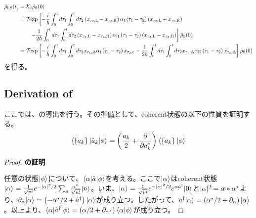 \documentclass[10pt, a4paper]{jsarticle}
\begin{document}
\begin{equation}
\begin{split}
\label{eq:512}
	\hat{\rho}_{\rm I,S}(t) &= \mathcal{K}_{t} \hat{\rho}_{\rm S}(0) \\
		&= \mathcal{T}_{} {\rm exp} \left[ - \dfrac{i}{\hbar} \int_{0}^{t} d\tau_{1} \int_{0}^{t} d\tau_{2}  \left(x_{\tau_{2}, {\rm L}} - x_{\tau_{2}, {\rm R}}\right) \alpha_{\rm I} \left(\tau_{1} - \tau_{2} \right) \left(x_{\tau_{2}, {\rm L}} + x_{\tau_{2}, {\rm R}}\right) \right. \\
		&\qquad \left. - \dfrac{1}{2 \hbar} \int_{0}^{t} d\tau_{1} \int_{0}^{t} d\tau_{2}  \left(x_{\tau_{2}, {\rm L}} - x_{\tau_{2}, {\rm R}}\right) \alpha_{\rm R} \left(\tau_{1} - \tau_{2} \right) \left(x_{\tau_{2}, {\rm L}} - x_{\tau_{2}, {\rm R}}\right) \right] \hat{\rho}_{\rm S}(0) \\
		&= \mathcal{T}_{} {\rm exp} \left[ - \dfrac{i}{\hbar} \int_{0}^{t} d\tau_{1} \int_{0}^{t} d\tau_{2}  x_{\tau_{1}, \Delta} \alpha_{\rm I} \left(\tau_{1} - \tau_{2} \right) x_{\tau_{2}, {\rm c}} - \dfrac{1}{2 \hbar} \int_{0}^{t} d\tau_{1} \int_{0}^{t} d\tau_{2}  x_{\tau_{1}, \Delta} \alpha_{\rm R} \left(\tau_{1} - \tau_{2} \right) x_{\tau_{2}, \Delta} \right] \hat{\rho}_{\rm S}(0)
\end{split}
\end{equation}
を得る。

\subsection{Derivation of }
\label{sec:52}

ここでは、の導出を行う。その準備として、coherent状態の以下の性質を証明する。
\begin{equation}
\begin{split}
\label{eq:513}
	{}_{\rm }\langle \left\{ a_{k} \right\}_{} | \hat{a}_{k} | \phi \rangle_{\rm } = \left( \dfrac{a_{k}}{2} + \dfrac{\partial}{\partial a_{k}^{*}} \right) {}_{\rm }\langle \left\{ a_{k} \right\}_{} | \phi \rangle_{\rm }
\end{split}
\end{equation}

\begin{proof}{\textbf{の証明}}

	任意の状態$| \phi \rangle_{\rm }$について、${}_{\rm }\langle \alpha | \hat{a}_{} | \phi \rangle_{\rm }$を考える。ここで$| \alpha \rangle_{\rm }$はcoherent状態$| \alpha \rangle_{\rm } = \frac{1}{\sqrt{pi}} e^{- | \alpha |^{2}/2} \sum_{n} \frac{\alpha^{n}}{\sqrt{n!}} | n \rangle_{\rm }$。いま、$| \alpha \rangle_{\rm } = \frac{1}{\sqrt{pi}} e^{- | \alpha |^{2}/2} e^{\alpha \hat{a}_{}^{\dagger}} | 0 \rangle_{\rm }$と$| \alpha |^{2} = \alpha * \alpha^{*}$より、$\partial_{\alpha} | \alpha \rangle_{\rm } = \left( - \alpha^{*}/2 + \hat{a}_{}^{\dagger} \right) | \alpha \rangle_{\rm }$が成り立つ。したがって、$\hat{a}_{}^{\dagger} | \alpha \rangle_{\rm } = \left( \alpha^{*}/2 + \partial_{\alpha} \right) | \alpha \rangle_{\rm }$。以上より、${}_{\rm }\langle \alpha | \hat{a}_{}^{\dagger} | \phi \rangle_{\rm } = \left( \alpha / 2 + \partial_{\alpha^{*}} \right) {}_{\rm }\langle \alpha | \phi \rangle_{\rm }$が成り立つ。

\end{proof}
\end{document}
